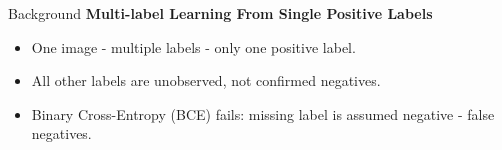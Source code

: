 







\begin{frame}{Background}
  \textbf{Multi-label Learning From Single Positive Labels}
  \begin{itemize}
    \item One image - multiple labels - only one positive label.
    \item All other labels are unobserved, not confirmed negatives.
    \item Binary Cross-Entropy (BCE) fails: missing label is assumed negative - false negatives.
  \end{itemize}
\end{frame}





